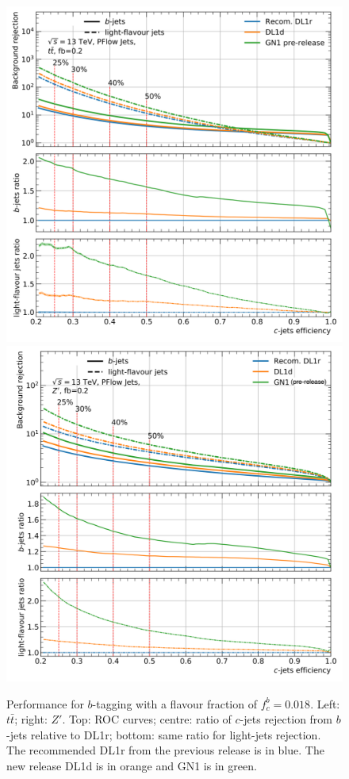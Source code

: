 \begin{figure}[h!]
{  }
  \caption{Performance for $b$-tagging with a flavour fraction of $f^b_c = 0.018$. Left: $t\bar{t}$; right: $Z'$. Top: ROC curves; centre: ratio of $c$-jets rejection from $b$-jets relative to DL1r; bottom: same ratio for light-jets rejection. The recommended DL1r from the previous release is in blue. The new release DL1d is in orange and GN1 is in green.}
  \label{fig:DL1dtt}
  \bigskip
  \centerline{
  \includegraphics[scale=0.45]{Images/FTAG/DL1d/ROC/ttc.png}
  \includegraphics[scale=0.45]{Images/FTAG/DL1d/ROC/zpc.png}
}
\end{figure}
